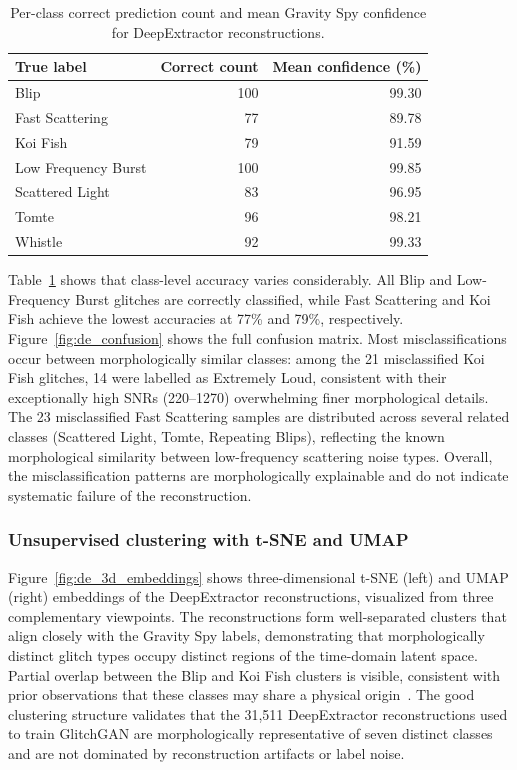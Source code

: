 \documentclass[reprint,nofootinbib,amsmath,amssymb,aps,floatfix]{revtex4-2}
\begin{document}
\begin{table}[h]
\centering
\caption{Per-class correct prediction count and mean Gravity Spy confidence for DeepExtractor reconstructions.}
\label{tab:de_per_class}
\begin{tabular}{l r r}
\toprule
True label          & Correct count & Mean confidence (\%) \\
\midrule
Blip                & 100           & 99.30 \\
Fast Scattering     & 77            & 89.78 \\
Koi Fish            & 79            & 91.59 \\
Low Frequency Burst & 100           & 99.85 \\
Scattered Light     & 83            & 96.95 \\
Tomte               & 96            & 98.21 \\
Whistle             & 92            & 99.33 \\
\bottomrule
\end{tabular}
\end{table}

Table~\ref{tab:de_per_class} shows that class-level accuracy varies considerably.
All Blip and Low-Frequency Burst glitches are correctly classified, while Fast Scattering and Koi Fish achieve the lowest accuracies at 77\% and 79\%, respectively.
Figure~\ref{fig:de_confusion} shows the full confusion matrix.
Most misclassifications occur between morphologically similar classes: among the 21 misclassified Koi Fish glitches, 14 were labelled as Extremely Loud, consistent with their exceptionally high SNRs (220--1270) overwhelming finer morphological details.
The 23 misclassified Fast Scattering samples are distributed across several related classes (Scattered Light, Tomte, Repeating Blips), reflecting the known morphological similarity between low-frequency scattering noise types.
Overall, the misclassification patterns are morphologically explainable and do not indicate systematic failure of the reconstruction.


\subsubsection{Unsupervised clustering with t-SNE and UMAP}

Figure~\ref{fig:de_3d_embeddings} shows three-dimensional t-SNE (left) and UMAP (right) embeddings of the DeepExtractor reconstructions, visualized from three complementary viewpoints.
The reconstructions form well-separated clusters that align closely with the Gravity Spy labels, demonstrating that morphologically distinct glitch types occupy distinct regions of the time-domain latent space.
Partial overlap between the Blip and Koi Fish clusters is visible, consistent with prior observations that these classes may share a physical origin~\citep{Areeda2017}.
The good clustering structure validates that the 31,511 DeepExtractor reconstructions used to train GlitchGAN are morphologically representative of seven distinct classes and are not dominated by reconstruction artifacts or label noise.
\end{document}
